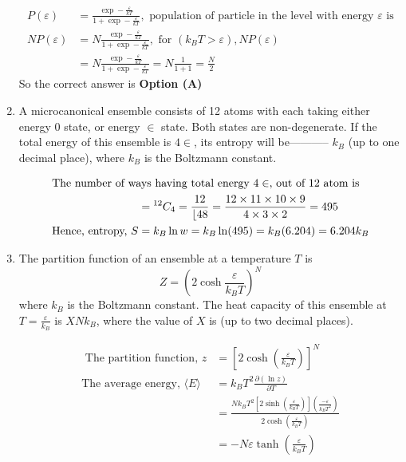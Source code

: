 \begin{enumerate}
\begin{tasks}
\end{tasks}
\begin{answer}
\begin{align*}
P(\varepsilon)&=\frac{\exp -\frac{\varepsilon}{k T}}{1+\exp -\frac{\varepsilon}{k T}},\text{ population of particle in the level with energy $\varepsilon$ is}\\
N P(\varepsilon)&=N \frac{\exp -\frac{\varepsilon}{k T}}{1+\exp -\frac{\varepsilon}{k T}},\text{ for }\left(k_{B} T>\varepsilon\right), N P(\varepsilon)\\&=N \frac{\exp -\frac{\varepsilon}{k T}}{1+\exp -\frac{\varepsilon}{k T}}=N \frac{1}{1+1}=\frac{N}{2}
\end{align*}
So the correct answer is \textbf{Option (A)}
\end{answer}	
\item  A microcanonical ensemble consists of 12 atoms with each taking either energy 0 state, or energy $\in$ state. Both states are non-degenerate. If the total energy of this ensemble is $4 \in$, its entropy will be----------- $k_{B}$ (up to one decimal place), where $k_{B}$ is the Boltzmann constant.
{}
\begin{answer}
\begin{align*}
\intertext{The number of ways having total energy $4 \in$, out of 12 atom is}
&={ }^{12} C_{4}=\frac{12}{\lfloor 48}=\frac{12 \times 11 \times 10 \times 9}{4 \times 3 \times 2}=495\\
\text{Hence, entropy, }S&=k_{B} \ln w=k_{B} \ln (495)=k_{B}(6.204)=6.204 k_{B}
\end{align*}
\end{answer}	
\item  The partition function of an ensemble at a temperature $T$ is
$$
Z=\left(2 \cosh \frac{\varepsilon}{k_{B} T}\right)^{N}
$$
where $k_{B}$ is the Boltzmann constant. The heat capacity of this ensemble at $T=\frac{\varepsilon}{k_{B}}$ is $X N k_{B}$, where the value of $X$ is (up to two decimal places).
{}
\begin{answer}
\begin{align*}
\text{	The partition function, }z&=\left[2 \cosh \left(\frac{\varepsilon}{k_{B} T}\right)\right]^{N}\\
\text{The average energy, }\langle E\rangle&=k_{B} T^{2} \frac{\partial(\ln z)}{\partial T}\\
&=\frac{N k_{B} T^{2}\left[2 \sinh \left(\frac{\varepsilon}{k_{B} T}\right)\right]\left(\frac{-\varepsilon}{k_{B} T^{2}}\right)}{2 \cosh \left(\frac{\varepsilon}{k_{B} T}\right)}\\&=-N \varepsilon \tanh \left(\frac{\varepsilon}{k_{B} T}\right)\\

\end{align*}
\end{answer}
\end{enumerate}
